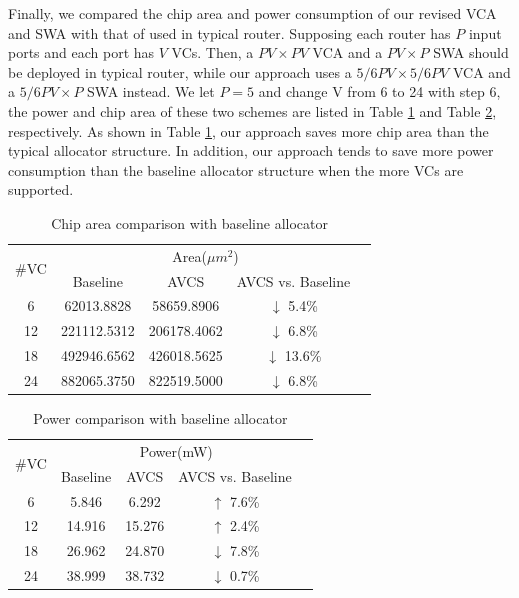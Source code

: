 \documentclass[paper]{ieice}
\begin{document}
Finally, we compared the chip area and power consumption of our revised VCA and SWA with that of used in typical router. Supposing each router has $P$ input ports and each port has $V$ VCs. Then, a $PV\times PV$ VCA and a $PV\times P$ SWA should be deployed in typical router, while our approach uses a $5/6PV\times 5/6PV$ VCA and a $5/6PV\times P$ SWA instead. We let $P=5$ and change V from 6 to 24 with step 6, the power and chip area of these two schemes are listed in Table \ref{alloccost1} and Table \ref{alloccost2}, respectively. As shown in Table \ref{alloccost1}, our approach saves more chip area than the typical allocator structure. In addition, our approach tends to save more power consumption than the baseline allocator structure when the more VCs are supported.
\begin{table}[h]
\centering\caption{Chip area comparison with baseline allocator}\label{alloccost1}
\begin{tabular}{|c|c|c|c|c|}
\hline
\multirow{2}{*}{$\#$VC} & \multicolumn{3}{|c|}{Area($\mu m^2$)}\\
\cline{2-4}
& Baseline & AVCS & AVCS vs. Baseline\\
\hline
6 & 62013.8828 & 58659.8906 & $\downarrow$ 5.4\%\\
\hline
12 & 221112.5312 & 206178.4062 & $\downarrow$ 6.8\%\\
\hline
18 & 492946.6562 & 426018.5625 & $\downarrow$ 13.6\%\\
\hline
24 & 882065.3750 & 822519.5000 & $\downarrow$ 6.8\%\\
\hline
\end{tabular}
\end{table}
\begin{table}[h]
\centering\caption{Power comparison with baseline allocator}\label{alloccost2}
\begin{tabular}{|c|c|c|c|c|}
\hline
\multirow{2}{*}{$\#$VC} & \multicolumn{3}{|c|}{Power(mW)}\\
\cline{2-4}
& Baseline & AVCS & AVCS vs. Baseline\\
\hline
6 & 5.846 & 6.292 & $\uparrow$ 7.6\%\\
\hline
12 & 14.916 & 15.276 & $\uparrow$ 2.4\%\\
\hline
18 & 26.962 & 24.870 & $\downarrow$ 7.8\%\\
\hline
24 & 38.999 & 38.732 & $\downarrow$ 0.7\%\\
\hline
\end{tabular}
\end{table}
\end{document}
